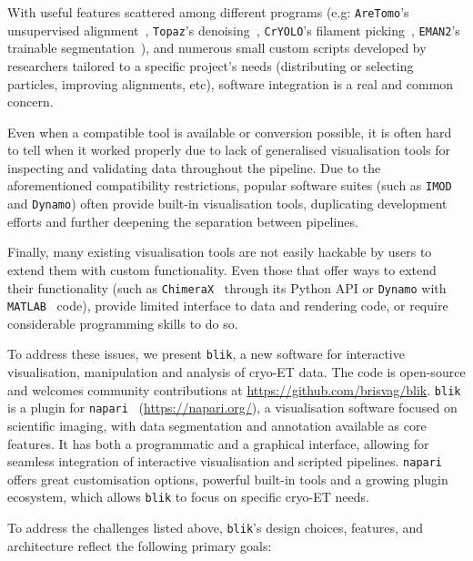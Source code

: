 With useful features scattered among different programs (e.g: \texttt{AreTomo}'s unsupervised alignment~\cite{zhengAreTomoIntegratedSoftware2022}, \texttt{Topaz}'s denoising~\cite{beplerTopazDenoiseGeneralDeep2020}, \texttt{CrYOLO}'s filament picking~\cite{wagnerSPHIREcrYOLOFastAccurate2019}, \texttt{EMAN2}'s trainable segmentation~\cite{galaz-montoyaSingleParticleTomography2015}), and numerous small custom scripts developed by researchers tailored to a specific project's needs (distributing or selecting particles, improving alignments, etc), software integration is a real and common concern.

Even when a compatible tool is available or conversion possible, it is often hard to tell when it worked properly due to lack of generalised visualisation tools for inspecting and validating data throughout the pipeline. Due to the aforementioned compatibility restrictions, popular software suites (such as \texttt{IMOD} and \texttt{Dynamo}) often provide built-in visualisation tools, duplicating development efforts and further deepening the separation between pipelines.

Finally, many existing visualisation tools are not easily hackable by users to extend them with custom functionality. Even those that offer ways to extend their functionality (such as \texttt{ChimeraX}~\cite{pettersenUCSFChimeraXStructure2021} through its Python API or \texttt{Dynamo} with \texttt{MATLAB}~\cite{MATLAB} code), provide limited interface to data and rendering code, or require considerable programming skills to do so.

\vspace{\baselineskip}

To address these issues, we present \texttt{blik}, a new software for interactive visualisation, manipulation and analysis of cryo-ET data. The code is open-source and welcomes community contributions at \url{https://github.com/brisvag/blik}. \texttt{blik} is a plugin for \texttt{napari}~\cite{thenaparicommunityNapariMultidimensionalImage-} (\url{https://napari.org/}), a visualisation software focused on scientific imaging, with data segmentation and annotation available as core features. It has both a programmatic and a graphical interface, allowing for seamless integration of interactive visualisation and scripted pipelines. \texttt{napari} offers great customisation options, powerful built-in tools and a growing plugin ecosystem, which allows \texttt{blik} to focus on specific cryo-ET needs.

To address the challenges listed above, \texttt{blik}'s design choices, features, and architecture reflect the following primary goals:

